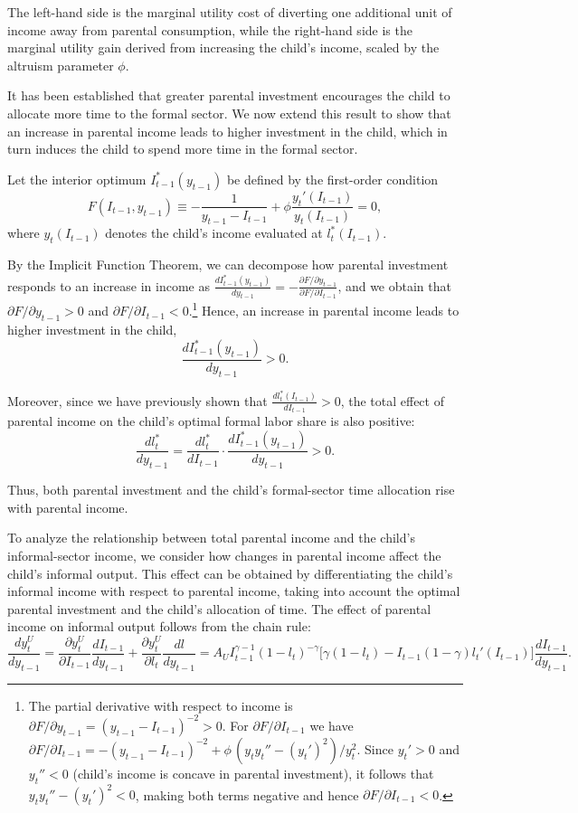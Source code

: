 \documentclass[12pt]{article}
\begin{document}
The left-hand side is the marginal utility cost of diverting one additional unit of income away from parental consumption, while the right-hand side is the marginal utility gain derived from increasing the child’s income, scaled by the altruism parameter $\phi$.


It has been established that greater parental investment encourages the child to allocate more time to the formal sector. We now extend this result to show that an increase in parental income leads to higher investment in the child, which in turn induces the child to spend more time in the formal sector.


Let the interior optimum $I_{t-1}^*(y_{t-1})$ be defined by the first-order condition
\[
F(I_{t-1},y_{t-1})
\equiv
-\frac{1}{y_{t-1}-I_{t-1}}
+ \phi\frac{y_t'(I_{t-1})}{y_t(I_{t-1})}
=0,
\]
where $y_t(I_{t-1})$ denotes the child's income evaluated at $l_t^*(I_{t-1})$.

By the Implicit Function Theorem, we can decompose how parental investment responds to an increase in income as $\frac{d I_{t-1}^*(y_{t-1})}{dy_{t-1}} =-\frac{\partial F/\partial y_{t-1}}{\partial F/\partial I_{t-1}}$, and we obtain that $\partial F/\partial y_{t-1}>0$ and $\partial F/\partial I_{t-1}<0$.\footnote{
The partial derivative with respect to income is $\partial F/\partial y_{t-1}=(y_{t-1}-I_{t-1})^{-2}>0$.  
For $\partial F/\partial I_{t-1}$ we have
$\partial F/\partial I_{t-1}=-(y_{t-1}-I_{t-1})^{-2} + \phi\,(y_{t} y_{t}'' - (y_{t}')^2)/y_{t}^2$.  
Since $y_{t}'>0$ and $y_{t}''<0$ (child's income is concave in parental investment), it follows that $y_{t} y_{t}''-(y_{t}')^2<0$, making both terms negative and hence $\partial F/\partial I_{t-1}<0$.
}
Hence, an increase in parental income leads to higher investment in the child, 
\[
\frac{d I_{t-1}^*(y_{t-1})}{dy_{t-1}} > 0.
\]


Moreover, since we have previously shown that $\frac{d l_t^*(I_{t-1})}{d I_{t-1}}>0$, the total effect of parental income on the child's optimal formal labor share is also positive:
\[
\frac{d l_t^*}{d y_{t-1}}
=
\frac{d l_t^*}{d I_{t-1}}
\cdot
\frac{d I_{t-1}^*(y_{t-1})}{dy_{t-1}}
>0.
\]


Thus, both parental investment and the child's formal-sector time allocation rise with parental income.

To analyze the relationship between total parental income and the child's informal-sector income, we consider how changes in parental income affect the child's informal output. This effect can be obtained by differentiating the child's informal income with respect to parental income, taking into account the optimal parental investment and the child's allocation of time. The effect of parental income on informal output follows from the chain rule:
\[
\frac{d y_t^U}{d y_{t-1}}
= \frac{\partial y_t^U}{\partial I_{t-1}}\frac{dI_{t-1}}{dy_{t-1}}
+ \frac{\partial y_t^U}{\partial l_t}\frac{dl}{dy_{t-1}}
= A_U I_{t-1}^{\gamma-1}(1-l_t)^{-\gamma}
\Big[\gamma(1-l_t)-I_{t-1}(1-\gamma)l_t'(I_{t-1})\Big]\frac{dI_{t-1}}{dy_{t-1}}.
\]
\end{document}
